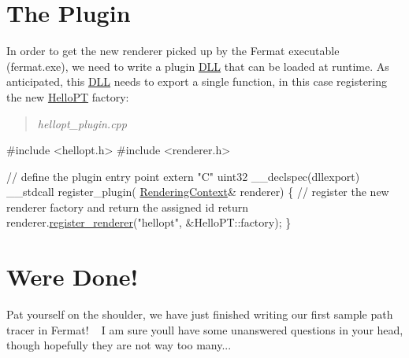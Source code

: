 \hypertarget{_hello_renderer_page_HelloPTPluginSection}{}\section{The Plugin}\label{_hello_renderer_page_HelloPTPluginSection}
\begin{DoxyParagraph}{}
In order to get the new renderer picked up by the Fermat executable (fermat.\+exe), we need to write a plugin \hyperlink{struct_d_l_l}{D\+LL} that can be loaded at runtime. As anticipated, this \hyperlink{struct_d_l_l}{D\+LL} needs to export a single function, in this case registering the new \hyperlink{struct_hello_p_t}{Hello\+PT} factory\+: ~\newline
\begin{quote}
{\itshape  hellopt\+\_\+plugin.\+cpp }

\end{quote}

\begin{DoxyCodeInclude}

\textcolor{preprocessor}{#include <hellopt.h>}
\textcolor{preprocessor}{#include <renderer.h>}

\textcolor{comment}{// define the plugin entry point}
\textcolor{keyword}{extern} \textcolor{stringliteral}{"C"} uint32 \_\_declspec(dllexport) \_\_stdcall register\_plugin(
      \hyperlink{struct_rendering_context}{RenderingContext}& renderer)
\{
    \textcolor{comment}{// register the new renderer factory and return the assigned id}
    \textcolor{keywordflow}{return} renderer.\hyperlink{struct_rendering_context_a69b3e0b8c8cc4aaf4a9751529f86ca68}{register\_renderer}(\textcolor{stringliteral}{"hellopt"}, &HelloPT::factory);
\}

\end{DoxyCodeInclude}
 
\end{DoxyParagraph}
\hypertarget{_hello_renderer_page_HelloPTDoneSection}{}\section{We\textquotesingle{}re Done!}\label{_hello_renderer_page_HelloPTDoneSection}
\begin{DoxyParagraph}{}
Pat yourself on the shoulder, we have just finished writing our first sample path tracer in Fermat! ~\newline
 I am sure you\textquotesingle{}ll have some unanswered questions in your head, though hopefully they are not way too many... 
\end{DoxyParagraph}
